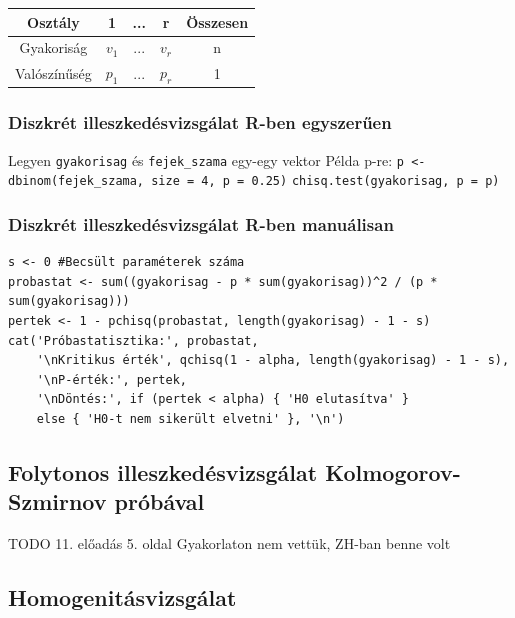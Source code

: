 \documentclass[12pt,a4paper]{article}
\begin{document}
\begin{table}[h]
	\centering
	\begin{tabular}{|c|c|c|c|c|}
		\hline
		Osztály & 1 & ... & r & Összesen \\
		\hline
		Gyakoriság & $v_1$ & ... & $v_r$ & n \\
		\hline
		Valószínűség & $p_1$ & ... & $p_r$ & 1 \\
		\hline
	\end{tabular}
\end{table}

\subsubsection{Diszkrét illeszkedésvizsgálat R-ben egyszerűen}

\begin{outline}
	\1 Legyen \texttt{gyakorisag} és \texttt{fejek\_szama} egy-egy vektor
	\1 Példa p-re: \texttt{p <- dbinom(fejek\_szama, size = 4, p = 0.25)}
	\1 \texttt{chisq.test(gyakorisag, p = p)}
\end{outline}

\subsubsection{Diszkrét illeszkedésvizsgálat R-ben manuálisan}

\begin{verbatim}
s <- 0 #Becsült paraméterek száma
probastat <- sum((gyakorisag - p * sum(gyakorisag))^2 / (p * sum(gyakorisag)))
pertek <- 1 - pchisq(probastat, length(gyakorisag) - 1 - s)
cat('Próbastatisztika:', probastat,
    '\nKritikus érték', qchisq(1 - alpha, length(gyakorisag) - 1 - s),
    '\nP-érték:', pertek,
    '\nDöntés:', if (pertek < alpha) { 'H0 elutasítva' }
    else { 'H0-t nem sikerült elvetni' }, '\n')\end{verbatim}

\subsection{Folytonos illeszkedésvizsgálat Kolmogorov-Szmirnov próbával}

\begin{outline}
	\1 TODO 11. előadás 5. oldal
	\1 Gyakorlaton nem vettük, ZH-ban benne volt
\end{outline}

\subsection{Homogenitásvizsgálat}
\end{document}
